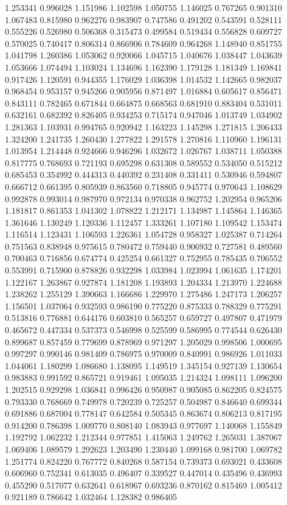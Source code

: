1.253341
0.996028
1.151986
1.102598
1.050755
1.146025
0.767265
0.901310
1.067483
0.815980
0.962276
0.983907
0.747586
0.491202
0.543591
0.528111
0.555226
0.526980
0.506368
0.315473
0.499584
0.519434
0.556828
0.609727
0.570025
0.740417
0.806314
0.866906
0.784609
0.964268
1.148940
0.851755
1.041798
1.260386
1.053062
0.920066
1.045715
1.040676
1.038447
1.043639
1.053666
1.074494
1.103024
1.134696
1.162390
1.179128
1.181349
1.169841
0.917426
1.120591
0.944355
1.176029
1.036398
1.014532
1.142665
0.982037
0.968454
0.953157
0.945266
0.905956
0.871497
1.016884
0.605617
0.856471
0.843111
0.782465
0.671844
0.664875
0.668563
0.681910
0.883404
0.531011
0.632161
0.682392
0.826405
0.934253
0.715174
0.947046
1.013749
1.034902
1.281363
1.103931
0.994765
0.920942
1.163223
1.145298
1.271815
1.206433
1.324200
1.241735
1.260430
1.277822
1.291578
1.270816
1.110960
1.196131
1.013954
1.214448
0.924666
0.946296
1.032672
1.026767
1.038711
1.050388
0.817775
0.768693
0.721193
0.695298
0.631308
0.589552
0.534050
0.515212
0.685453
0.354992
0.444313
0.440392
0.231408
0.331411
0.530946
0.594807
0.666712
0.661395
0.805939
0.863560
0.718805
0.945774
0.970643
1.108629
0.992878
0.993014
0.987970
0.972134
0.970338
0.962752
1.202954
0.965206
1.181817
0.861353
1.041302
1.078822
1.212171
1.134987
1.145864
1.146365
1.361646
1.130249
1.120336
1.112457
1.333261
1.107180
1.109542
1.153474
1.116514
1.123431
1.106593
1.226361
1.054728
0.958327
1.025387
0.714264
0.751563
0.838948
0.975615
0.780472
0.759440
0.906932
0.727581
0.489560
0.700463
0.716856
0.674774
0.425254
0.661327
0.752955
0.785435
0.706552
0.553991
0.715900
0.878826
0.932298
1.033984
1.023994
1.061635
1.174201
1.122167
1.263867
0.927874
1.181208
1.193893
1.204334
1.213970
1.224688
1.238262
1.255129
1.390663
1.166686
1.229970
1.275486
1.247173
1.206257
1.156501
1.037064
0.932593
0.986190
0.775220
0.875333
0.788329
0.775291
0.513816
0.776881
0.644176
0.603810
0.565257
0.659727
0.497807
0.471979
0.465672
0.447334
0.537373
0.546998
0.525599
0.586995
0.774544
0.626430
0.899687
0.857459
0.779699
0.878969
0.971297
1.205029
0.998506
1.000695
0.997297
0.990146
0.981409
0.786975
0.970009
0.840991
0.986926
1.011033
1.044061
1.180299
1.086680
1.138095
1.149519
1.345154
0.927139
1.130654
0.983883
0.991592
0.865721
0.919461
1.095035
1.214324
1.098111
1.096200
1.202515
0.929298
1.036841
0.996426
0.950987
0.905085
0.862205
0.824575
0.793330
0.768669
0.749978
0.720239
0.725257
0.504987
0.846640
0.699344
0.691886
0.687004
0.778147
0.642584
0.505345
0.863674
0.806213
0.817195
0.914200
0.786398
1.009770
0.808140
1.083943
0.977697
1.140068
1.155849
1.192792
1.062232
1.212344
0.977851
1.415063
1.249762
1.265031
1.387067
1.069406
1.089579
1.292623
1.203490
1.230440
1.099168
0.981700
1.069782
1.251774
0.824220
0.767772
0.840268
0.587154
0.739373
0.693021
0.433608
0.606960
0.752341
0.613035
0.496407
0.339527
0.447014
0.435496
0.436993
0.455290
0.517077
0.632641
0.618967
0.693236
0.870162
0.815469
1.005412
0.921189
0.786642
1.032464
1.128382
0.986405
